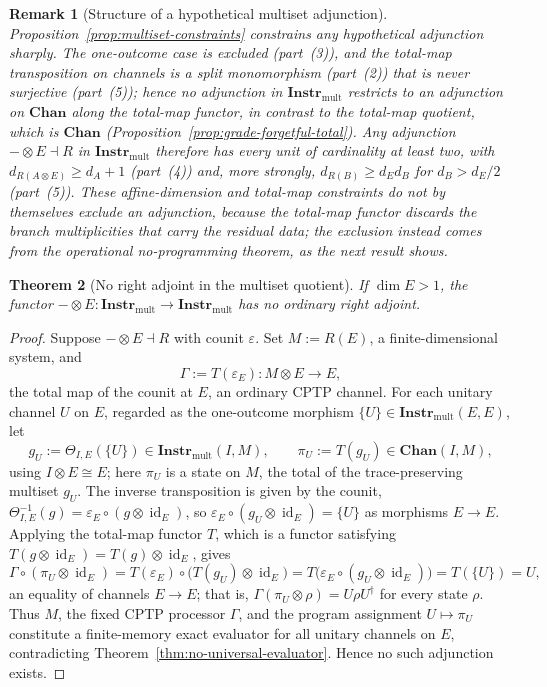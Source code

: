 \documentclass[11pt]{article}
\newtheorem{theorem}{Theorem}[section]
\newtheorem{remark}[theorem]{Remark}
\DeclareMathOperator{\id}{id}
\begin{document}
\begin{remark}[Structure of a hypothetical multiset adjunction]
\label{rem:grade-forgetful-open}
Proposition~\ref{prop:multiset-constraints} constrains any hypothetical
adjunction sharply. The one-outcome case is excluded (part~(3)), and the
total-map transposition on channels is a split monomorphism
(part~(2)) that is never surjective (part~(5)); hence no adjunction in
$\mathbf{Instr}_{\mathrm{mult}}$ restricts to an adjunction on $\mathbf{Chan}$
along the total-map functor, in contrast to the total-map quotient, which is
$\mathbf{Chan}$ (Proposition~\ref{prop:grade-forgetful-total}). Any adjunction
$-\otimes E\dashv R$ in $\mathbf{Instr}_{\mathrm{mult}}$ therefore has every unit
of cardinality at least two, with $d_{R(A\otimes E)}\ge d_A+1$ (part~(4)) and,
more strongly, $d_{R(B)}\ge d_E d_B$ for $d_B>d_E/2$ (part~(5)). These
affine-dimension and total-map constraints do not by themselves exclude an
adjunction, because the total-map functor discards the branch multiplicities that
carry the residual data; the exclusion instead comes from the operational
no-programming theorem, as the next result shows.
\end{remark}

\begin{theorem}[No right adjoint in the multiset quotient]
\label{thm:multiset-no-right}
If $\dim E>1$, the functor
$-\otimes E:\mathbf{Instr}_{\mathrm{mult}}\to\mathbf{Instr}_{\mathrm{mult}}$
has no ordinary right adjoint.
\end{theorem}

\begin{proof}
Suppose $-\otimes E\dashv R$ with counit $\varepsilon$. Set $M:=R(E)$, a
finite-dimensional system, and
\[
\Gamma:=T(\varepsilon_E):M\otimes E\longrightarrow E,
\]
the total map of the counit at $E$, an ordinary CPTP channel. For each unitary
channel $U$ on $E$, regarded as the one-outcome morphism
$\{U\}\in\mathbf{Instr}_{\mathrm{mult}}(E,E)$, let
\[
g_U:=\Theta_{I,E}(\{U\})\in\mathbf{Instr}_{\mathrm{mult}}(I,M),
\qquad
\pi_U:=T(g_U)\in\mathbf{Chan}(I,M),
\]
using $I\otimes E\cong E$; here $\pi_U$ is a state on $M$, the total of the
trace-preserving multiset $g_U$. The inverse transposition is given by the
counit, $\Theta_{I,E}^{-1}(g)=\varepsilon_E\circ(g\otimes\id_E)$, so
$\varepsilon_E\circ(g_U\otimes\id_E)=\{U\}$ as morphisms $E\to E$. Applying the
total-map functor $T$, which is a functor satisfying
$T(g\otimes\id_E)=T(g)\otimes\id_E$, gives
\[
\Gamma\circ(\pi_U\otimes\id_E)
=
T(\varepsilon_E)\circ\bigl(T(g_U)\otimes\id_E\bigr)
=
T\bigl(\varepsilon_E\circ(g_U\otimes\id_E)\bigr)
=
T(\{U\})
=
U ,
\]
an equality of channels $E\to E$; that is, $\Gamma(\pi_U\otimes\rho)=U\rho
U^\dagger$ for every state $\rho$. Thus $M$, the fixed CPTP processor $\Gamma$,
and the program assignment $U\mapsto\pi_U$ constitute a finite-memory exact
evaluator for all unitary channels on $E$, contradicting
Theorem~\ref{thm:no-universal-evaluator}. Hence no such adjunction exists.
\end{proof}
\end{document}
